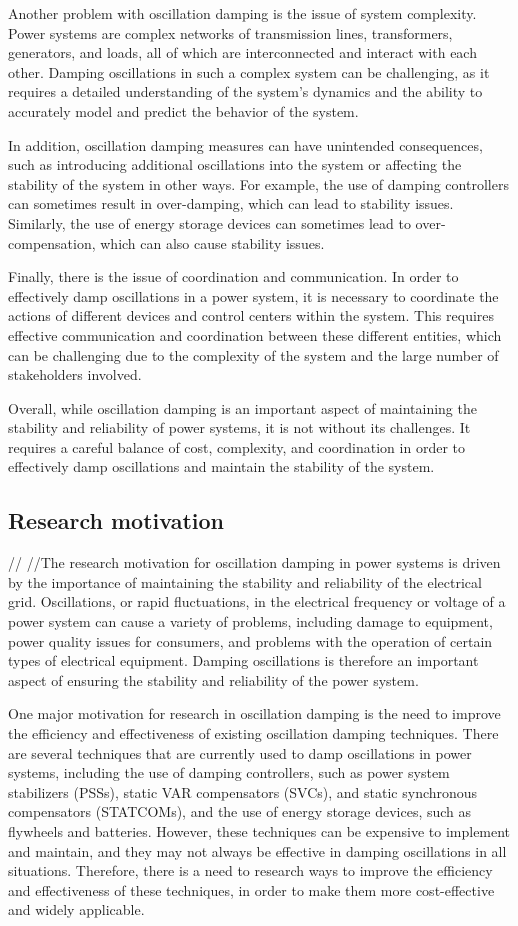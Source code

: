 \documentclass[12pt]{article}
\begin{document}
Another problem with oscillation damping is the issue of system complexity. Power systems are complex networks of transmission lines, transformers, generators, and loads, all of which are interconnected and interact with each other. Damping oscillations in such a complex system can be challenging, as it requires a detailed understanding of the system's dynamics and the ability to accurately model and predict the behavior of the system.

In addition, oscillation damping measures can have unintended consequences, such as introducing additional oscillations into the system or affecting the stability of the system in other ways. For example, the use of damping controllers can sometimes result in over-damping, which can lead to stability issues. Similarly, the use of energy storage devices can sometimes lead to over-compensation, which can also cause stability issues.

Finally, there is the issue of coordination and communication. In order to effectively damp oscillations in a power system, it is necessary to coordinate the actions of different devices and control centers within the system. This requires effective communication and coordination between these different entities, which can be challenging due to the complexity of the system and the large number of stakeholders involved.

Overall, while oscillation damping is an important aspect of maintaining the stability and reliability of power systems, it is not without its challenges. It requires a careful balance of cost, complexity, and coordination in order to effectively damp oscillations and maintain the stability of the system.
\subsection{Research motivation}//
//The research motivation for oscillation damping in power systems is driven by the importance of maintaining the stability and reliability of the electrical grid. Oscillations, or rapid fluctuations, in the electrical frequency or voltage of a power system can cause a variety of problems, including damage to equipment, power quality issues for consumers, and problems with the operation of certain types of electrical equipment. Damping oscillations is therefore an important aspect of ensuring the stability and reliability of the power system.

One major motivation for research in oscillation damping is the need to improve the efficiency and effectiveness of existing oscillation damping techniques. There are several techniques that are currently used to damp oscillations in power systems, including the use of damping controllers, such as power system stabilizers (PSSs), static VAR compensators (SVCs), and static synchronous compensators (STATCOMs), and the use of energy storage devices, such as flywheels and batteries. However, these techniques can be expensive to implement and maintain, and they may not always be effective in damping oscillations in all situations. Therefore, there is a need to research ways to improve the efficiency and effectiveness of these techniques, in order to make them more cost-effective and widely applicable.
\end{document}
